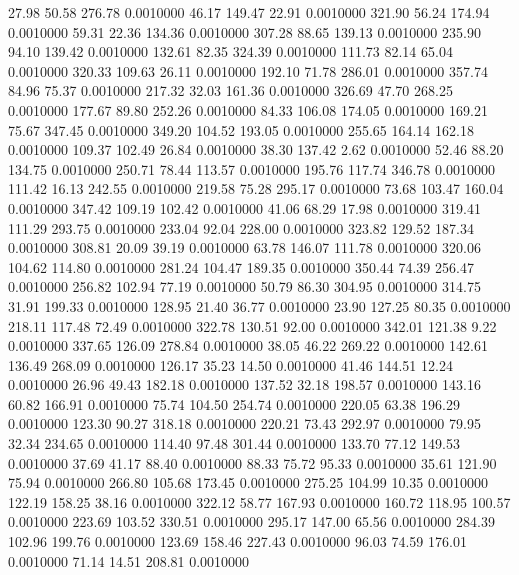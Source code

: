   27.98   50.58  276.78   0.0010000
  46.17  149.47   22.91   0.0010000
 321.90   56.24  174.94   0.0010000
  59.31   22.36  134.36   0.0010000
 307.28   88.65  139.13   0.0010000
 235.90   94.10  139.42   0.0010000
 132.61   82.35  324.39   0.0010000
 111.73   82.14   65.04   0.0010000
 320.33  109.63   26.11   0.0010000
 192.10   71.78  286.01   0.0010000
 357.74   84.96   75.37   0.0010000
 217.32   32.03  161.36   0.0010000
 326.69   47.70  268.25   0.0010000
 177.67   89.80  252.26   0.0010000
  84.33  106.08  174.05   0.0010000
 169.21   75.67  347.45   0.0010000
 349.20  104.52  193.05   0.0010000
 255.65  164.14  162.18   0.0010000
 109.37  102.49   26.84   0.0010000
  38.30  137.42    2.62   0.0010000
  52.46   88.20  134.75   0.0010000
 250.71   78.44  113.57   0.0010000
 195.76  117.74  346.78   0.0010000
 111.42   16.13  242.55   0.0010000
 219.58   75.28  295.17   0.0010000
  73.68  103.47  160.04   0.0010000
 347.42  109.19  102.42   0.0010000
  41.06   68.29   17.98   0.0010000
 319.41  111.29  293.75   0.0010000
 233.04   92.04  228.00   0.0010000
 323.82  129.52  187.34   0.0010000
 308.81   20.09   39.19   0.0010000
  63.78  146.07  111.78   0.0010000
 320.06  104.62  114.80   0.0010000
 281.24  104.47  189.35   0.0010000
 350.44   74.39  256.47   0.0010000
 256.82  102.94   77.19   0.0010000
  50.79   86.30  304.95   0.0010000
 314.75   31.91  199.33   0.0010000
 128.95   21.40   36.77   0.0010000
  23.90  127.25   80.35   0.0010000
 218.11  117.48   72.49   0.0010000
 322.78  130.51   92.00   0.0010000
 342.01  121.38    9.22   0.0010000
 337.65  126.09  278.84   0.0010000
  38.05   46.22  269.22   0.0010000
 142.61  136.49  268.09   0.0010000
 126.17   35.23   14.50   0.0010000
  41.46  144.51   12.24   0.0010000
  26.96   49.43  182.18   0.0010000
 137.52   32.18  198.57   0.0010000
 143.16   60.82  166.91   0.0010000
  75.74  104.50  254.74   0.0010000
 220.05   63.38  196.29   0.0010000
 123.30   90.27  318.18   0.0010000
 220.21   73.43  292.97   0.0010000
  79.95   32.34  234.65   0.0010000
 114.40   97.48  301.44   0.0010000
 133.70   77.12  149.53   0.0010000
  37.69   41.17   88.40   0.0010000
  88.33   75.72   95.33   0.0010000
  35.61  121.90   75.94   0.0010000
 266.80  105.68  173.45   0.0010000
 275.25  104.99   10.35   0.0010000
 122.19  158.25   38.16   0.0010000
 322.12   58.77  167.93   0.0010000
 160.72  118.95  100.57   0.0010000
 223.69  103.52  330.51   0.0010000
 295.17  147.00   65.56   0.0010000
 284.39  102.96  199.76   0.0010000
 123.69  158.46  227.43   0.0010000
  96.03   74.59  176.01   0.0010000
  71.14   14.51  208.81   0.0010000
